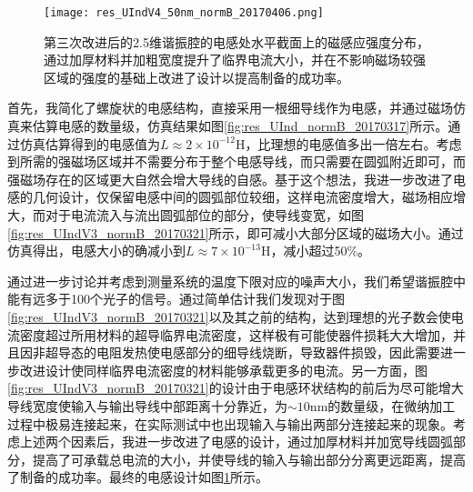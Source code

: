             

            \begin{figure}[h]
                \centering
                \texttt{[image: res\_UIndV4\_50nm\_normB\_20170406.png]}
                \caption{第三次改进后的2.5维谐振腔的电感处水平截面上的磁感应强度分布，通过加厚材料并加粗宽度提升了临界电流大小，并在不影响磁场较强区域的强度的基础上改进了设计以提高制备的成功率。}
                \label{fig:res_UIndV4_50nm_normB_20170406}
            \end{figure}


            首先，我简化了螺旋状的电感结构，直接采用一根细导线作为电感，并通过磁场仿真来估算电感的数量级，仿真结果如图\ref{fig:res_UInd_normB_20170317}所示。通过仿真估算得到的电感值为$L\approx 2\times 10^{-12} \mathrm{H} $，比理想的电感值多出一倍左右。考虑到所需的强磁场区域并不需要分布于整个电感导线，而只需要在圆弧附近即可，而强磁场存在的区域更大自然会增大导线的自感。基于这个想法，我进一步改进了电感的几何设计，仅保留电感中间的圆弧部位较细，这样电流密度增大，磁场相应增大，而对于电流流入与流出圆弧部位的部分，使导线变宽，如图\ref{fig:res_UIndV3_normB_20170321}所示，即可减小大部分区域的磁场大小。通过仿真得出，电感大小的确减小到$L \approx 7\times 10^{-13} \mathrm{H} $，减小超过50\%。

            通过进一步讨论并考虑到测量系统的温度下限对应的噪声大小，我们希望谐振腔中能有远多于100个光子的信号。通过简单估计我们发现对于图\ref{fig:res_UIndV3_normB_20170321}以及其之前的结构，达到理想的光子数会使电流密度超过所用材料的超导临界电流密度，这样极有可能使器件损耗大大增加，并且因非超导态的电阻发热使电感部分的细导线烧断，导致器件损毁，因此需要进一步改进设计使同样临界电流密度的材料能够承载更多的电流。另一方面，图\ref{fig:res_UIndV3_normB_20170321}的设计由于电感环状结构的前后为尽可能增大导线宽度使输入与输出导线中部距离十分靠近，为$\sim 10 \mathrm{nm} $的数量级，在微纳加工过程中极易连接起来，在实际测试中也出现输入与输出两部分连接起来的现象。考虑上述两个因素后，我进一步改进了电感的设计，通过加厚材料并加宽导线圆弧部分，提高了可承载总电流的大小，并使导线的输入与输出部分分离更远距离，提高了制备的成功率。最终的电感设计如图\ref{fig:res_UIndV4_50nm_normB_20170406}所示。

            



    